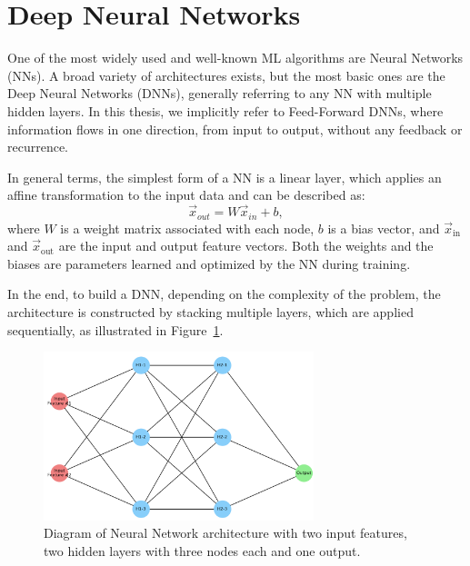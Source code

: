 \section{Deep Neural Networks}
\label{subsec:dnn_general}

One of the most widely used and well-known ML algorithms are Neural Networks (NNs). A broad variety of architectures exists, but the most basic ones are the Deep Neural Networks (DNNs), generally referring to any NN with multiple hidden layers. In this thesis, we implicitly refer to Feed-Forward DNNs, where information flows in one direction, from input to output, without any feedback or recurrence.

In general terms, the simplest form of a NN is a linear layer, which applies an affine transformation to the input data and can be described as:
\begin{equation}
    \vec{x}_{out} = W\vec{x}_{in} + b,
\end{equation}
where $W$ is a weight matrix associated with each node, $b$ is a bias vector, and $\vec{x}_{\text{in}}$ and $\vec{x}_{\text{out}}$ are the input and output feature vectors. Both the weights and the biases are parameters learned and optimized by the NN during training.

In the end, to build a DNN, depending on the complexity of the problem, the architecture is constructed by stacking multiple layers, which are applied sequentially, as illustrated in Figure~\ref{fig:dnn}.
\begin{figure}[htbp]
    \centering
    \includegraphics[width=0.7\textwidth]{images/dnn.png}
    \caption{Diagram of Neural Network architecture with two input features, two hidden layers with three nodes each and one output.}
    \label{fig:dnn}
  \end{figure}

